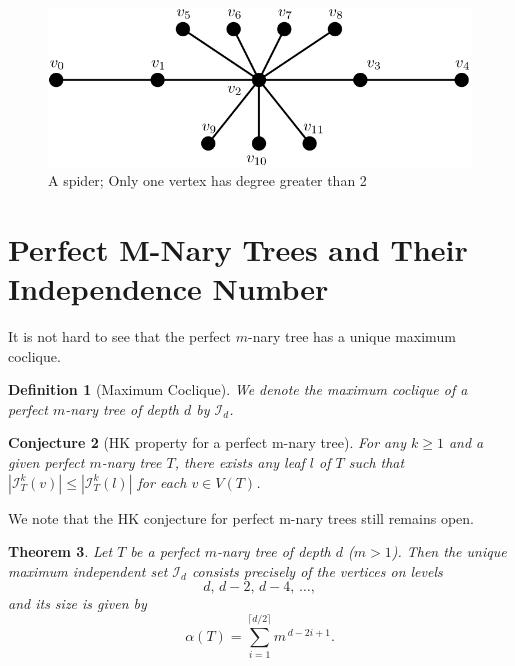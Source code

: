 \documentclass{amsart}
\newtheorem{theorem}{Theorem}[section]
\newtheorem{conjecture}[theorem]{Conjecture}
\newtheorem{definition}[theorem]{Definition}
\theoremstyle{definition}
\begin{document}
\begin{figure}[hbt!]
	\centering
	\includegraphics[width=0.75\linewidth]{images/spider_graph.png}
	\caption{A spider; Only one vertex has degree greater than 2}
\end{figure}

\section{Perfect M-Nary Trees and Their Independence Number}

It is not hard to see that the perfect $m$-nary tree has a unique maximum coclique.

\begin{definition}[Maximum Coclique]
	We denote the maximum coclique of a perfect $m$-nary tree of depth $d$ by $\mathcal{I}_d$.
\end{definition}

\begin{conjecture}[HK property for a perfect m-nary tree]
	For any $k \geq 1$ and a given perfect $m$-nary tree $T$, there exists any leaf $l$ of $T$ such that $|\mathcal{I}^k_T(v)| \leq |\mathcal{I}^k_T(l)|$ for each $v \in V(T)$.
\end{conjecture}

We note that the HK conjecture for perfect m-nary trees still remains open.

\begin{theorem}{\label{theorem:mnary_independence_num}}
	Let $T$ be a perfect $m$-nary tree of depth $d$ ($m>1$). Then the unique maximum independent set $\mathcal{I}_d$ consists precisely of the vertices on levels
	\[
		d,\, d-2,\, d-4,\, \dots,
	\]
	and its size is given by
	\[
		\alpha(T)=\sum_{i=1}^{\lceil d/2 \rceil} m^{\,d-2i+1}.
	\]
\end{theorem}
\end{document}
